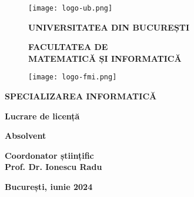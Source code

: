 \begin{titlepage}


\begin{figure}[!htb]
    \centering
    \begin{minipage}{0.2\textwidth}
        \texttt{[image: logo-ub.png]}
    \end{minipage}
    \begin{minipage}{0.5\textwidth}
        \large
        \vspace{0.2cm}
        \begin{center}
            \textbf{UNIVERSITATEA DIN BUCUREȘTI}
        \end{center}
        \vspace{0.3cm}
        \begin{center}
            \textbf{
                FACULTATEA DE \\
                MATEMATICĂ ȘI INFORMATICĂ
            }
        \end{center}
    \end{minipage}
    \begin{minipage}{0.2\textwidth}
        \texttt{[image: logo-fmi.png]}
    \end{minipage}
\end{figure}

\begin{center}
\textbf{SPECIALIZAREA INFORMATICĂ}
\end{center}

\vspace{1cm}

\begin{center}
\Large \textbf{Lucrare de licență}
\end{center}

\vspace{1cm}

\begin{center}
\Large \textbf{\MakeUppercase{\@title}}
\end{center}

\vspace{1cm}

\begin{center}
\large \textbf{Absolvent \\ \@author}
\end{center}

\vspace{1cm}

\begin{center}
\large \textbf{Coordonator științific \\ Prof. Dr. Ionescu Radu}
\end{center}

\vspace{1cm}

\begin{center}
\Large \textbf{București, iunie 2024}
\end{center}
\end{titlepage}